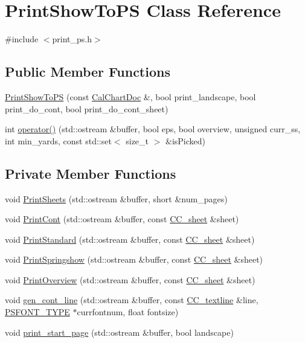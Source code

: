 \hypertarget{a00118}{\section{Print\-Show\-To\-P\-S Class Reference}
\label{a00118}
}


{\ttfamily \#include $<$print\-\_\-ps.\-h$>$}

\subsection*{Public Member Functions}
\begin{DoxyCompactItemize}
\item 
\hyperlink{a00118_ae4f98ffba196dac7fa95132470934eb9}{Print\-Show\-To\-P\-S} (const \hyperlink{a00020}{Cal\-Chart\-Doc} \&, bool print\-\_\-landscape, bool print\-\_\-do\-\_\-cont, bool print\-\_\-do\-\_\-cont\-\_\-sheet)
\item 
int \hyperlink{a00118_a5cff026c5de6ab065cf6ec7e1cadc7d2}{operator()} (std\-::ostream \&buffer, bool eps, bool overview, unsigned curr\-\_\-ss, int min\-\_\-yards, const std\-::set$<$ size\-\_\-t $>$ \&is\-Picked)
\end{DoxyCompactItemize}
\subsection*{Private Member Functions}
\begin{DoxyCompactItemize}
\item 
void \hyperlink{a00118_aab1ed76c487963d1dc4049051ec229e8}{Print\-Sheets} (std\-::ostream \&buffer, short \&num\-\_\-pages)
\item 
void \hyperlink{a00118_a4c025a7d1c021d9c6cf769ee76d05699}{Print\-Cont} (std\-::ostream \&buffer, const \hyperlink{a00045}{C\-C\-\_\-sheet} \&sheet)
\item 
void \hyperlink{a00118_a3117a363a48a8d3f974b0c82e1417de2}{Print\-Standard} (std\-::ostream \&buffer, const \hyperlink{a00045}{C\-C\-\_\-sheet} \&sheet)
\item 
void \hyperlink{a00118_a63ff4a093e781c760bd66a3993b9ad49}{Print\-Springshow} (std\-::ostream \&buffer, const \hyperlink{a00045}{C\-C\-\_\-sheet} \&sheet)
\item 
void \hyperlink{a00118_a94ec3860d2827f8e098cf0a5a1dc16e3}{Print\-Overview} (std\-::ostream \&buffer, const \hyperlink{a00045}{C\-C\-\_\-sheet} \&sheet)
\item 
void \hyperlink{a00118_aaa8c6f566670e4451de613afe2eafeed}{gen\-\_\-cont\-\_\-line} (std\-::ostream \&buffer, const \hyperlink{a00048}{C\-C\-\_\-textline} \&line, \hyperlink{a00216_ab7470ac62bba788b8cac09b1c6635c7e}{P\-S\-F\-O\-N\-T\-\_\-\-T\-Y\-P\-E} $\ast$currfontnum, float fontsize)
\item 
void \hyperlink{a00118_abd501d09aa6bc42ee74e06788fd08c51}{print\-\_\-start\-\_\-page} (std\-::ostream \&buffer, bool landscape)
\end{DoxyCompactItemize}
